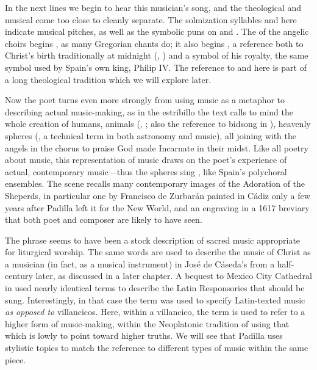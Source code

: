 In the next lines we begin to hear this musician's song, and the theological and
musical come too close to cleanly separate.
The solmization syllables  and  here indicate musical
pitches, as well as the symbolic puns on  and .
The  of the angelic choirs begins , as many
Gregorian  chants do; it also begins , a reference both to Christ's birth traditionally at midnight (, ) and a symbol of his royalty, the same
symbol used by Spain's own king, Philip IV.\citXXX
The reference to  and  here is part of a long
theological tradition which we will explore later.


Now the poet turns even more strongly from using music as a metaphor to
describing actual music-making, as in the estribillo the text calls to mind the
whole creation of humans, animals (, ; also
the reference to bidsong in ),
heavenly spheres (, a technical term in both astronomy
and music), all joining with the angels in the chorus to praise God made
Incarnate in their midst.
Like all poetry about music, this representation of music draws on the poet's
experience of actual, contemporary music---thus the spheres sing , like Spain's polychoral ensembles.
The scene recalls many contemporary images of the Adoration of the Sheperds, in
particular one by Francisco de Zurbarán painted in Cádiz only a few years after
Padilla left it for the New World, and an engraving in a 1617\XXX{} breviary
that both poet and composer are likely to have seen.\citXXX

The phrase  seems to have been a stock
description of sacred music appropriate for liturgical worship.
The same words are used to describe the music of Christ as a musician (in fact,
as a musical instrument) in José de Cáseda's  from
a half-century later, as discussed in a later chapter. %
A bequest\XXX{} to Mexico City Cathedral in \XXX[year] used nearly identical
terms to describe the Latin Responsories that should be sung.
Interestingly, in that case the term was used to specify Latin-texted music
\emph{as opposed to} villancicos.
Here, within a villancico, the term is used to refer to a higher form of
music-making, within the Neoplatonic tradition of using that which is lowly to
point toward higher truths. 
We will see that Padilla uses stylistic topics to match the reference to
different types of music within the same piece.

